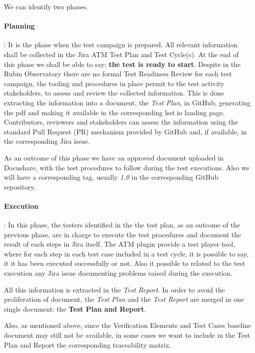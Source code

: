 We can identify two phases.

\paragraph{Planning}:
It is the phase when the test campaign is prepared. All relevant information shall be collected in the Jira ATM Test Plan and 
Test Cycle(s). 
At the end of this phase we shall be able to say: \textbf{the test is ready to start}.
Despite in the Rubin Observatory there are no formal Test Readiness Review for each test campaign, 
the tooling and procedures in place permit to the test activity stakeholders, to assess and review the collected information. 
This is done extracting the information into a document, the \textit{Test Plan}, in GitHub, generating the pdf and making it available
in the corresponding lsst.io landing page. Contributors, reviewers and stakeholders can assess the information using the 
standard Pull Request (PR) mechanism provided by GitHub and, if available, in the corresponding Jira issue.

As an outcome of this phase we have an approved document uploaded in Docushare, with the test procedures to follow during the test executions.
Also we will have a corresponding tag, usually \textit{1.0} in the corresponding GitHub repository.

\paragraph{Execution}:
In this phase, the testers identified in the the test plan, as an outcome of the previous phase, are in charge to execute the test procedures and 
document the result of each steps in Jira itself.
The ATM plugin provide a test player tool, where for each step in each test case included in a test cycle, it is possible to say, it it has been executed successfully or not.
Also it possible to related to the test execution any Jira issue documenting problems raised during the execution.

All this information is extracted in the \textit{Test Report}.
In order to avoid the proliferation of document, the \textit{Test Plan} and the \textit{Test Report} are merged in one single document: the \textbf{Test Plan and Report}.

Also, as mentioned above, since the Verification Elements and Test Cases baseline document may still not be available, in some cases we want to include in 
the Test Plan and Report the corresponding traceability matrix.


